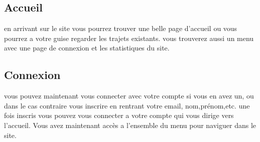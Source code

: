 	\subsection{Accueil}
		en arrivant sur le site vous pourrez trouver une belle page d'accueil ou vous pourrez a votre guise regarder les trajets existants. 
		vous trouverez aussi un menu avec une page de connexion et les statistiques du site. 
	\subsection{Connexion}
		vous pouvez maintenant vous connecter avec votre compte si vous en avez un, ou dans le cas contraire vous inscrire en rentrant votre email, nom,prénom,etc. 
		une fois inscris vous pouvez vous connecter a votre compte qui vous dirige vers l'accueil. Vous avez maintenant accès a l'ensemble du menu pour naviguer dans le site.
	
